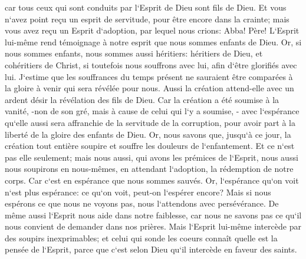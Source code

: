 \verse car tous ceux qui sont conduits par l`Esprit de Dieu sont fils de Dieu. 
\verse Et vous n`avez point reçu un esprit de servitude, pour être encore dans la crainte; mais vous avez reçu un Esprit d`adoption, par lequel nous crions: Abba! Père! 
\verse L`Esprit lui-même rend témoignage à notre esprit que nous sommes enfants de Dieu. 
\verse Or, si nous sommes enfants, nous sommes aussi héritiers: héritiers de Dieu, et cohéritiers de Christ, si toutefois nous souffrons avec lui, afin d`être glorifiés avec lui. 
\verse J`estime que les souffrances du temps présent ne sauraient être comparées à la gloire à venir qui sera révélée pour nous. 
\verse Aussi la création attend-elle avec un ardent désir la révélation des fils de Dieu. 
\verse Car la création a été soumise à la vanité, -non de son gré, mais à cause de celui qui l`y a soumise, - 
\verse avec l`espérance qu`elle aussi sera affranchie de la servitude de la corruption, pour avoir part à la liberté de la gloire des enfants de Dieu. 
\verse Or, nous savons que, jusqu`à ce jour, la création tout entière soupire et souffre les douleurs de l`enfantement. 
\verse Et ce n`est pas elle seulement; mais nous aussi, qui avons les prémices de l`Esprit, nous aussi nous soupirons en nous-mêmes, en attendant l`adoption, la rédemption de notre corps. 
\verse Car c`est en espérance que nous sommes sauvés. Or, l`espérance qu`on voit n`est plus espérance: ce qu`on voit, peut-on l`espérer encore? 
\verse Mais si nous espérons ce que nous ne voyons pas, nous l`attendons avec persévérance. 
\verse De même aussi l`Esprit nous aide dans notre faiblesse, car nous ne savons pas ce qu`il nous convient de demander dans nos prières. Mais l`Esprit lui-même intercède par des soupirs inexprimables; 
\verse et celui qui sonde les coeurs connaît quelle est la pensée de l`Esprit, parce que c`est selon Dieu qu`il intercède en faveur des saints. 
